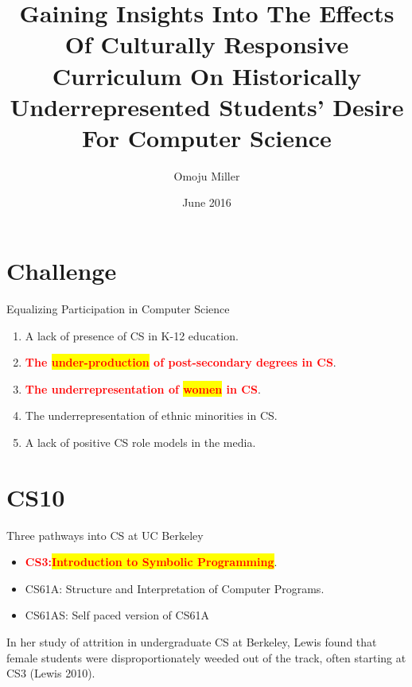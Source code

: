 \documentclass{beamer}                  %
\title[Culturally Responsive CS]{Gaining Insights Into The Effects Of Culturally Responsive Curriculum On Historically Underrepresented Students’ Desire For Computer Science}
\author[Miller]{Omoju Miller}
\institute[UC Berkeley]{University of California, Berkeley }
\date{June 2016}
\newcommand{\hilight}[1]{\colorbox{yellow}{#1}}
\begin{document}
\section{}
        \begin{frame}[plain]
            \titlepage 
        \end{frame}

\section{Challenge}
  \begin{frame}{}
    \begin{center}
      {\LARGE Equalizing Participation in Computer Science}
      \begin{enumerate}
                \item A lack of presence of CS in K-12 education.
                \item \textcolor{red}{\textbf{The \hilight{under-production} of post-secondary degrees in CS}}. 
                \item \textcolor{red}{\textbf{The underrepresentation of \hilight{women} in CS}}.
                \item The underrepresentation of ethnic minorities in CS.
                \item A lack of positive CS role models in the media. 
                
      \end{enumerate}
    \end{center}
  \end{frame}

\section{CS10}
        \begin{frame}{}
        Three pathways into CS at UC Berkeley
            \begin{itemize}
                \item \textcolor{red}{\textbf{CS3:\hilight{Introduction to Symbolic Programming}}}.
                \item CS61A: Structure and Interpretation of Computer Programs.
                \item CS61AS: Self paced version of CS61A
            \end{itemize}
        \end{frame}

        \begin{frame}{}
        In her study of attrition in undergraduate CS at Berkeley, Lewis found that female students were disproportionately weeded out of the track, often starting at CS3 (Lewis 2010).
        \end{frame}
\end{document}

